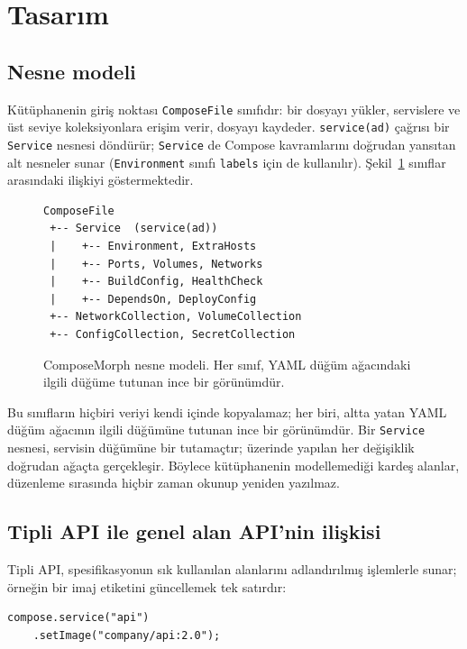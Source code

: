 \documentclass[conference]{IEEEtran}
\begin{document}
\section{Tasarım}
\label{sec:tasarim}

\subsection{Nesne modeli}
Kütüphanenin giriş noktası \texttt{ComposeFile} sınıfıdır: bir dosyayı
yükler, servislere ve üst seviye koleksiyonlara erişim verir, dosyayı
kaydeder. \texttt{service(ad)} çağrısı bir \texttt{Service} nesnesi
döndürür; \texttt{Service} de Compose kavramlarını doğrudan yansıtan alt
nesneler sunar (\texttt{Environment} sınıfı \texttt{labels} için de
kullanılır). Şekil~\ref{fig:model} sınıflar arasındaki ilişkiyi
göstermektedir.

\begin{figure}[t]
\centering
\begin{minipage}{0.8\columnwidth}
\footnotesize
\begin{verbatim}
ComposeFile
 +-- Service  (service(ad))
 |    +-- Environment, ExtraHosts
 |    +-- Ports, Volumes, Networks
 |    +-- BuildConfig, HealthCheck
 |    +-- DependsOn, DeployConfig
 +-- NetworkCollection, VolumeCollection
 +-- ConfigCollection, SecretCollection
\end{verbatim}
\end{minipage}
\caption{ComposeMorph nesne modeli. Her sınıf, YAML düğüm ağacındaki
ilgili düğüme tutunan ince bir görünümdür.}
\label{fig:model}
\end{figure}

Bu sınıfların hiçbiri veriyi kendi içinde kopyalamaz; her biri, altta yatan
YAML düğüm ağacının ilgili düğümüne tutunan ince bir görünümdür. Bir
\texttt{Service} nesnesi, servisin düğümüne bir tutamaçtır; üzerinde
yapılan her değişiklik doğrudan ağaçta gerçekleşir. Böylece kütüphanenin
modellemediği kardeş alanlar, düzenleme sırasında hiçbir zaman okunup
yeniden yazılmaz.

\subsection{Tipli API ile genel alan API'nin ilişkisi}
Tipli API, spesifikasyonun sık kullanılan alanlarını adlandırılmış
işlemlerle sunar; örneğin bir imaj etiketini güncellemek tek satırdır:

{\footnotesize
\begin{verbatim}
compose.service("api")
    .setImage("company/api:2.0");
\end{verbatim}
}
\end{document}
